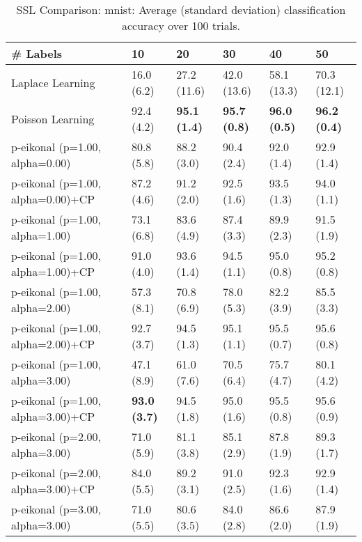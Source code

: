 \documentclass{article}
\begin{document}
\begin{table*}[t!]
\vspace{-3mm}
\caption{SSL Comparison: mnist: Average (standard deviation) classification accuracy over 100 trials.}
\vspace{-3mm}
\label{tab:SSL Comparison: mnist}
\vskip 0.15in
\begin{center}
\begin{small}
\begin{sc}
\begin{tabular}{llllll}
\toprule
\# Labels&\textbf{10}&\textbf{20}&\textbf{30}&\textbf{40}&\textbf{50}\\
\midrule
Laplace Learning&16.0 (6.2)      &27.2 (11.6)      &42.0 (13.6)      &58.1 (13.3)      &70.3 (12.1)      \\
Poisson Learning&92.4 (4.2)      &{\bf 95.1 (1.4)}&{\bf 95.7 (0.8)}&{\bf 96.0 (0.5)}&{\bf 96.2 (0.4)}\\
p-eikonal (p=1.00, alpha=0.00)&80.8 (5.8)      &88.2 (3.0)      &90.4 (2.4)      &92.0 (1.4)      &92.9 (1.4)      \\
p-eikonal (p=1.00, alpha=0.00)+CP&87.2 (4.6)      &91.2 (2.0)      &92.5 (1.6)      &93.5 (1.3)      &94.0 (1.1)      \\
p-eikonal (p=1.00, alpha=1.00)&73.1 (6.8)      &83.6 (4.9)      &87.4 (3.3)      &89.9 (2.3)      &91.5 (1.9)      \\
p-eikonal (p=1.00, alpha=1.00)+CP&91.0 (4.0)      &93.6 (1.4)      &94.5 (1.1)      &95.0 (0.8)      &95.2 (0.8)      \\
p-eikonal (p=1.00, alpha=2.00)&57.3 (8.1)      &70.8 (6.9)      &78.0 (5.3)      &82.2 (3.9)      &85.5 (3.3)      \\
p-eikonal (p=1.00, alpha=2.00)+CP&92.7 (3.7)      &94.5 (1.3)      &95.1 (1.1)      &95.5 (0.7)      &95.6 (0.8)      \\
p-eikonal (p=1.00, alpha=3.00)&47.1 (8.9)      &61.0 (7.6)      &70.5 (6.4)      &75.7 (4.7)      &80.1 (4.2)      \\
p-eikonal (p=1.00, alpha=3.00)+CP&{\bf 93.0 (3.7)}&94.5 (1.8)      &95.0 (1.6)      &95.5 (0.8)      &95.6 (0.9)      \\
p-eikonal (p=2.00, alpha=3.00)&71.0 (5.9)      &81.1 (3.8)      &85.1 (2.9)      &87.8 (1.9)      &89.3 (1.7)      \\
p-eikonal (p=2.00, alpha=3.00)+CP&84.0 (5.5)      &89.2 (3.1)      &91.0 (2.5)      &92.3 (1.6)      &92.9 (1.4)      \\
p-eikonal (p=3.00, alpha=3.00)&71.0 (5.5)      &80.6 (3.5)      &84.0 (2.8)      &86.6 (2.0)      &87.9 (1.9)      \\

\end{tabular}
\end{sc}
\end{small}
\end{center}
\end{table*}
\end{document}
